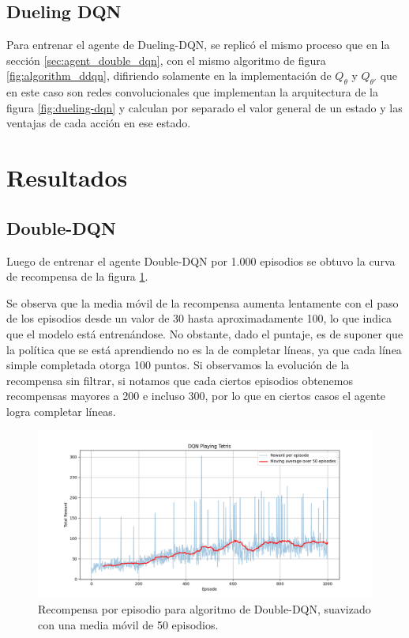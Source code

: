 \subsection{Dueling DQN}

Para entrenar el agente de Dueling-DQN, se replicó el mismo proceso que en la sección \ref{sec:agent_double_dqn}, con el mismo algoritmo de figura \ref{fig:algorithm_ddqn}, difiriendo solamente en la implementación de \(Q_\theta\) y \(Q_{\theta\prime}\) que en este caso son redes convolucionales que implementan la arquitectura de la figura \ref{fig:dueling-dqn} y calculan por separado el valor general de un estado y las ventajas de cada acción en ese estado.

\section{Resultados}

\subsection{Double-DQN}

Luego de entrenar el agente Double-DQN por 1.000 episodios se obtuvo la curva de recompensa de la figura \ref{fig:ddqn_rewards}.

Se observa que la media móvil de la recompensa aumenta lentamente con el paso de los episodios desde un valor de 30 hasta aproximadamente 100, lo que indica que el modelo está entrenándose. No obstante, dado el puntaje, es de suponer que la política que se está aprendiendo no es la de completar líneas, ya que cada línea simple completada otorga 100 puntos. Si observamos la evolución de la recompensa sin filtrar, si notamos que cada ciertos episodios obtenemos recompensas mayores a 200 e incluso 300, por lo que en ciertos casos el agente logra completar líneas.

\clearpage

\begin{figure}[hbt!]
	\centering
	\includegraphics[width=\textwidth]{./Figures/ddqn_rewards.png}
	\caption{Recompensa por episodio para algoritmo de Double-DQN, suavizado con una media móvil de 50 episodios.}
	\label{fig:ddqn_rewards}
\end{figure}

